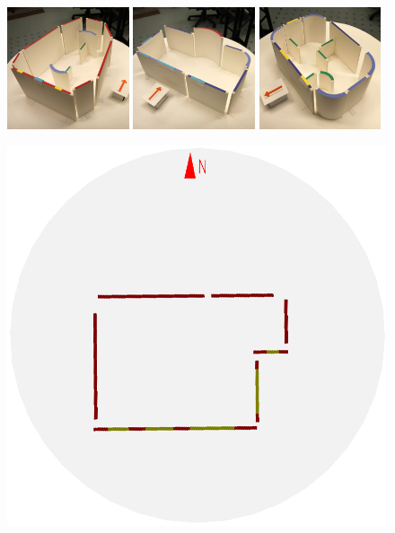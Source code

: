 \begin{figure}[t]
\begin{minipage}[b]{0.85\textwidth}
  \includegraphics[width=0.32\textwidth]{p4m_38_new_design}\hfill %
  \includegraphics[width=0.32\textwidth]{p4m_68_new_design}\hfill %
  \includegraphics[width=0.32\textwidth]{p4m_98_new_design}~ %
\end{minipage}
\hfill
\begin{minipage}[b]{0.14\textwidth}
  \includegraphics[width=\textwidth]{p4m_0_2D_walls_rotate}\\ %

\end{minipage}
\end{figure}
